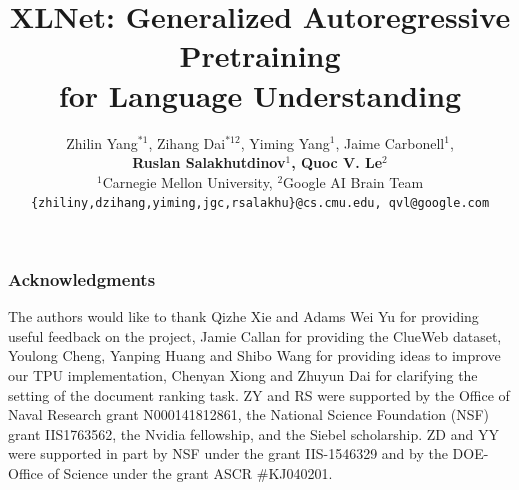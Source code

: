 \documentclass{article}
\title{XLNet: Generalized Autoregressive Pretraining \\ for Language Understanding}
\author{Zhilin Yang$^{*1}$, Zihang Dai$^{*12}$, Yiming Yang$^1$, Jaime Carbonell$^1$, \\
  {\bf Ruslan Salakhutdinov$^1$, Quoc V. Le$^2$}\\
  $^1$Carnegie Mellon University, $^2$Google AI Brain Team \\
  {\small \texttt{\{zhiliny,dzihang,yiming,jgc,rsalakhu\}@cs.cmu.edu, qvl@google.com} } 
}
\begin{document}
\maketitle

\renewcommand{\thefootnote}{\fnsymbol{footnote}}
\renewcommand{\thefootnote}{\arabic{footnote}}









\subsubsection*{Acknowledgments}
The authors would like to thank Qizhe Xie and Adams Wei Yu for providing useful feedback on the project, Jamie Callan for providing the ClueWeb dataset, Youlong Cheng, Yanping Huang and Shibo Wang for providing ideas to improve our TPU implementation, Chenyan Xiong and Zhuyun Dai for clarifying the setting of the document ranking task.
ZY and RS were supported by the Office of Naval Research grant N000141812861, the National Science Foundation (NSF) grant IIS1763562, the Nvidia fellowship, and the Siebel scholarship.
ZD and YY were supported in part by NSF under the grant IIS-1546329 and by the DOE-Office of Science under the grant ASCR \#KJ040201.





\newpage

\end{document}
